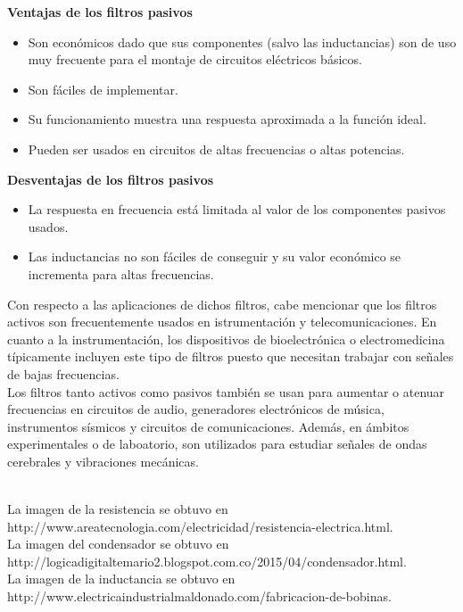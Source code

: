 \documentclass[prb,aps,preprintnumbers,amsmath,amssymb]{revtex4}
\begin{document}
\textbf{Ventajas de los filtros pasivos}

\begin{itemize}
	\item Son económicos dado que sus componentes (salvo las inductancias) son de uso muy frecuente para el montaje de circuitos eléctricos básicos.
	
	\item Son fáciles de implementar.
	
	\item Su funcionamiento muestra una respuesta aproximada a la función ideal.
	
	\item Pueden ser usados en circuitos de altas frecuencias o altas potencias.
\end{itemize}

\textbf{Desventajas de los filtros pasivos}

\begin{itemize}
	\item La respuesta en frecuencia está limitada al valor de los componentes pasivos usados.
	
	\item Las inductancias no son fáciles de conseguir y su valor económico se incrementa para altas frecuencias.
\end{itemize}

Con respecto a las aplicaciones de dichos filtros, cabe mencionar que los filtros activos son frecuentemente usados en istrumentación y telecomunicaciones. En cuanto a la instrumentación, los dispositivos de bioelectrónica o electromedicina típicamente incluyen este tipo de filtros puesto que necesitan trabajar con señales de bajas frecuencias. \\

Los filtros tanto activos como pasivos también se usan para aumentar o atenuar frecuencias en circuitos de audio, generadores electrónicos de música, instrumentos sísmicos y circuitos de comunicaciones. Además, en ámbitos experimentales o de laboatorio, son utilizados para estudiar señales de ondas cerebrales y vibraciones mecánicas.\\


\begin{thebibliography}{99}
\
\\
 La imagen de la resistencia se obtuvo en http://www.areatecnologia.com/electricidad/resistencia-electrica.html.\\

 La imagen del condensador se obtuvo en http://logicadigitaltemario2.blogspot.com.co/2015/04/condensador.html.\\

 La imagen de la inductancia se obtuvo en http://www.electricaindustrialmaldonado.com/fabricacion-de-bobinas.\\


\end{thebibliography}
\end{document}
